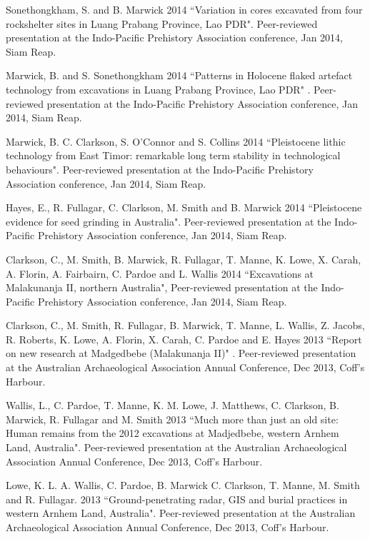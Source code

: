 \medskip

\ind Sonethongkham, S. and B. Marwick 2014 ``Variation in cores excavated from four rockshelter sites in Luang Prabang Province, Lao PDR". Peer-reviewed presentation at the Indo-Pacific Prehistory Association conference, Jan 2014, Siam Reap.

\ind Marwick, B.  and S. Sonethongkham 2014 ``Patterns in Holocene flaked artefact technology from excavations in Luang Prabang Province, Lao PDR" . Peer-reviewed presentation at the Indo-Pacific Prehistory Association conference, Jan 2014, Siam Reap.

\ind Marwick, B. C. Clarkson, S. O’Connor and S. Collins 2014 ``Pleistocene lithic technology from East Timor: remarkable long term stability in technological behaviours". Peer-reviewed presentation at the Indo-Pacific Prehistory Association conference, Jan 2014, Siam Reap.

\ind Hayes, E., R. Fullagar, C. Clarkson, M. Smith and B. Marwick 2014 ``Pleistocene evidence for seed grinding in Australia". Peer-reviewed presentation at the Indo-Pacific Prehistory Association conference, Jan 2014, Siam Reap.

\ind Clarkson, C., M. Smith, B. Marwick, R. Fullagar, T. Manne, K. Lowe, X. Carah,  A. Florin, A.  Fairbairn, C. Pardoe and L. Wallis 2014 ``Excavations at Malakunanja II, northern Australia",  Peer-reviewed presentation at the Indo-Pacific Prehistory Association conference, Jan 2014, Siam Reap.

\ind Clarkson, C., M. Smith, R. Fullagar, B. Marwick, T. Manne, L. Wallis, Z. Jacobs, R. Roberts, K. Lowe, A. Florin, X. Carah, C. Pardoe and E. Hayes 2013 ``Report on new research at Madgedbebe (Malakunanja II)" . Peer-reviewed presentation at the Australian Archaeological Association Annual Conference, Dec 2013, Coff’s Harbour. 

\ind Wallis, L., C. Pardoe, T. Manne, K. M. Lowe, J. Matthews, C.   Clarkson, B. Marwick, R. Fullagar and M. Smith 2013 ``Much more than just an old site: Human remains from the 2012 excavations at Madjedbebe, western Arnhem Land, Australia". Peer-reviewed presentation at the Australian Archaeological Association Annual Conference, Dec 2013, Coff’s Harbour.

\ind Lowe, K. L. A. Wallis, C. Pardoe, B. Marwick C. Clarkson, T. Manne, M. Smith and R. Fullagar. 2013 ``Ground-penetrating radar, GIS and burial practices in western Arnhem Land, Australia". Peer-reviewed presentation at the Australian Archaeological Association Annual Conference, Dec 2013, Coff’s Harbour.

